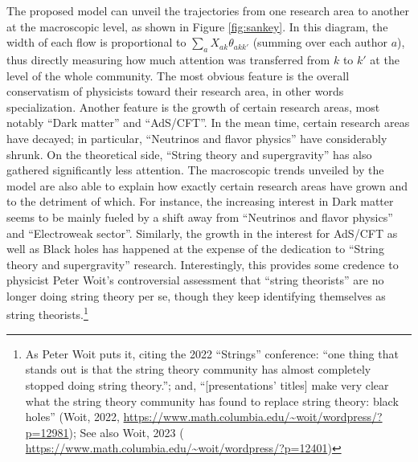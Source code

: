 \documentclass{article}
\begin{document}
The proposed model can unveil the trajectories from one research area to another at the macroscopic level, as shown in Figure \ref{fig:sankey}. In this diagram, the width of each flow is proportional to $\sum_a X_{ak}\theta_{akk'}$ (summing over each author $a$), thus directly measuring how much attention was transferred from $k$ to $k'$ at the level of the whole community. The most obvious feature is the overall conservatism of physicists toward their research area, in other words specialization. Another feature is the growth of certain research areas, most notably ``Dark matter'' and ``AdS/CFT''. In the mean time, certain research areas have decayed; in particular, ``Neutrinos and flavor physics'' have considerably shrunk. %
On the theoretical side, ``String theory and supergravity'' has also gathered significantly less attention. The macroscopic trends unveiled by the model are also able to explain how exactly certain research areas have grown and to the detriment of which. For instance, the increasing interest in Dark matter seems to be mainly fueled by a shift away from ``Neutrinos and flavor physics'' and ``Electroweak sector''. Similarly, the growth in the interest for AdS/CFT as well as Black holes has happened at the expense of the dedication to ``String theory and supergravity'' research. Interestingly, this provides some credence to physicist Peter Woit's controversial assessment that ``string theorists'' are no longer doing string theory per se, though they keep identifying themselves as string theorists.\footnote{As Peter Woit puts it, citing the 2022 ``Strings'' conference: ``one thing that stands out is that the string theory community has almost completely stopped doing string theory.''; and, ``[presentations' titles] make very clear what the string theory community has found to replace string theory: black holes'' (Woit, 2022, \url{https://www.math.columbia.edu/~woit/wordpress/?p=12981}); See also Woit, 2023 ( \url{https://www.math.columbia.edu/~woit/wordpress/?p=12401})}
\end{document}
